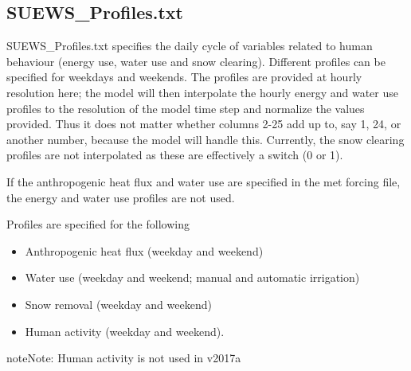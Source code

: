 \documentclass[letterpaper,10pt,english]{sphinxmanual}
\begin{document}
\subsection{SUEWS\_Profiles.txt}
\label{\detokenize{input_files/SUEWS_SiteInfo/SUEWS_Profiles:id1}}\label{\detokenize{input_files/SUEWS_SiteInfo/SUEWS_Profiles::doc}}\label{\detokenize{input_files/SUEWS_SiteInfo/SUEWS_Profiles:suews-profiles-txt}}
SUEWS\_Profiles.txt specifies the daily cycle of variables related to
human behaviour (energy use, water use and snow clearing). Different
profiles can be specified for weekdays and weekends. The profiles are
provided at hourly resolution here; the model will then interpolate the
hourly energy and water use profiles to the resolution of the model time
step and normalize the values provided. Thus it does not matter whether
columns 2-25 add up to, say 1, 24, or another number, because the model
will handle this. Currently, the snow clearing profiles are not
interpolated as these are effectively a switch (0 or 1).

If the anthropogenic heat flux and water use are specified in the met
forcing file, the energy and water use profiles are not used.

Profiles are specified for the following
\begin{itemize}
\item {} 
Anthropogenic heat flux (weekday and weekend)

\item {} 
Water use (weekday and weekend; manual and automatic irrigation)

\item {} 
Snow removal (weekday and weekend)

\item {} 
Human activity (weekday and weekend).

\end{itemize}

\begin{sphinxadmonition}{note}{Note:}
Human activity is not used in v2017a
\end{sphinxadmonition}
\end{document}
